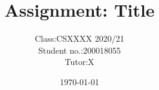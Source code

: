 


\title{Assignment: Title}
\author{
    \begin{tabular}{rl}
        Class:& CSXXXX 2020/21 \\
        Student no.:& 200018055 \\
        Tutor:& X \\
    \end{tabular}
}
\date{\today}
\maketitle




